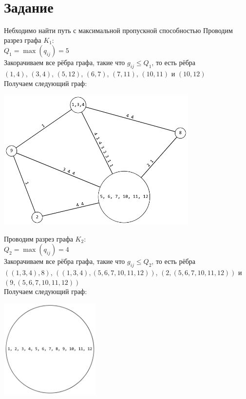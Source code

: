 \documentclass[12pt,a4paper]{report}
\begin{document}
\section*{Задание}
Небходимо найти путь с максимальной пропускной способностью
\hfill\break
Проводим разрез графа $K_1$:\\
$Q_1=\max(q_{ij})=5$\\
Закорачиваем все рёбра графа, такие что $g_{ij} \leq Q_1$, то есть рёбра\\
$(1, 4)$, $(3, 4)$, $(5, 12)$, $(6, 7)$, $(7, 11)$, $(10, 11)$ и $(10, 12)$\\
Получаем следующий граф:\\
\begin{center}
    \includegraphics*[width=10cm]{graph_2.png}
\end{center}
Проводим разрез графа $K_2$:\\
$Q_2=\max(q_{ij})=4$\\
Закорачиваем все рёбра графа, такие что $g_{ij} \leq Q_2$, то есть рёбра\\
$((1, 3, 4), 8)$, $((1, 3, 4), (5, 6, 7, 10, 11, 12))$, $(2, (5, 6, 7, 10, 11, 12))$ и $(9, (5, 6, 7, 10, 11, 12))$\\
Получаем следующий граф:\\
\begin{center}
    \includegraphics*[width=5cm]{graph_3.png}
\end{center}
\end{document}
